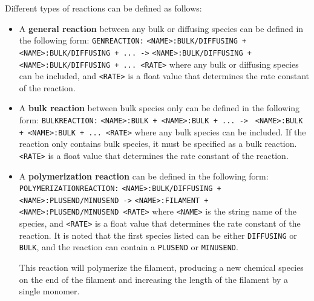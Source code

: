 \documentclass[11pt, oneside]{article}   	%
\begin{document}
\noindent Different types of reactions can be defined as follows:
\begin{itemize}


\item A \textbf{general reaction} between any bulk or diffusing species can be defined in the following form: \newline\texttt{GENREACTION:}\newline 
\texttt{<NAME>:BULK/DIFFUSING + <NAME>:BULK/DIFFUSING + ... ->}\newline
\texttt{<NAME>:BULK/DIFFUSING + <NAME>:BULK/DIFFUSING + ... <RATE>}\newline\newline 
where any bulk or diffusing species can be included, and \texttt{<RATE>} is a float value that determines the rate constant of the reaction.

\item A \textbf{bulk reaction} between bulk species only can be defined in the following form: \newline\newline
\texttt{BULKREACTION:}\newline
\texttt{<NAME>:BULK + <NAME>:BULK + ... ->}\newline
\texttt{ <NAME>:BULK + <NAME>:BULK + ... <RATE>}\newline\newline 
where any bulk species can be included. If the reaction only contains bulk species, it must be specified as a bulk reaction. \texttt{<RATE>} is a float value that determines the rate constant  of the reaction.

\item A \textbf{polymerization reaction} can be defined in the following form:\newline\newline
\texttt{POLYMERIZATIONREACTION:}\newline
\texttt{<NAME>:BULK/DIFFUSING + <NAME>:PLUSEND/MINUSEND ->}\newline
\texttt{<NAME>:FILAMENT + <NAME>:PLUSEND/MINUSEND <RATE>}\newline\newline 
where \texttt{<NAME>} is the string name of the species, and \texttt{<RATE>} is a float value that determines the rate constant  of the reaction. It is noted that the first species listed can be either \texttt{DIFFUSING} or \texttt{BULK}, and the reaction can contain a \texttt{PLUSEND} or \texttt{MINUSEND}.

This reaction will polymerize the filament, producing a new chemical species on the end of the filament and increasing 
the length of the filament by a single monomer.


\end{itemize}
\end{document}
